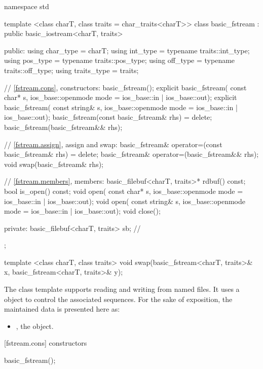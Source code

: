 %
\begin{codeblock}
namespace std {
  template <class charT, class traits = char_traits<charT>>
  class basic_fstream
    : public basic_iostream<charT, traits> {
  public:
    using char_type   = charT;
    using int_type    = typename traits::int_type;
    using pos_type    = typename traits::pos_type;
    using off_type    = typename traits::off_type;
    using traits_type = traits;

    // \ref{fstream.cons}, constructors:
    basic_fstream();
    explicit basic_fstream(
      const char* s,
      ios_base::openmode mode = ios_base::in | ios_base::out);
    explicit basic_fstream(
      const string& s,
      ios_base::openmode mode = ios_base::in | ios_base::out);
    basic_fstream(const basic_fstream& rhs) = delete;
    basic_fstream(basic_fstream&& rhs);

    // \ref{fstream.assign}, assign and swap:
    basic_fstream& operator=(const basic_fstream& rhs) = delete;
    basic_fstream& operator=(basic_fstream&& rhs);
    void swap(basic_fstream& rhs);

    // \ref{fstream.members}, members:
    basic_filebuf<charT, traits>* rdbuf() const;
    bool is_open() const;
    void open(
      const char* s,
      ios_base::openmode mode = ios_base::in | ios_base::out);
    void open(
      const string& s,
      ios_base::openmode mode = ios_base::in | ios_base::out);
    void close();

  private:
    basic_filebuf<charT, traits> sb; // \expos
  };

  template <class charT, class traits>
    void swap(basic_fstream<charT, traits>& x,
              basic_fstream<charT, traits>& y);
}
\end{codeblock}

\pnum
The
class template
supports reading and writing from named files.
It uses a
object to control the associated sequences.
For the sake of exposition, the maintained data is presented here as:
\begin{itemize}
\item
{}, the  object.
\end{itemize}

[fstream.cons]{ constructors}

%
\begin{itemdecl}
basic_fstream();
\end{itemdecl}

